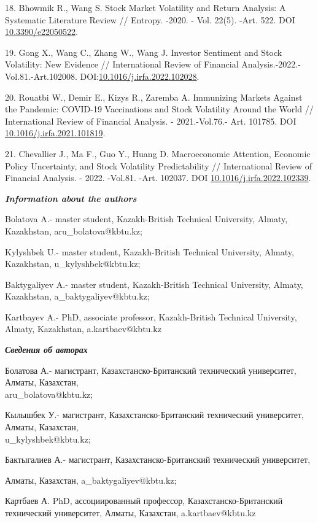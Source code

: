 \begin{references}
18. Bhowmik R., Wang S. Stock Market Volatility and Return Analysis: A
Systematic Literature Review // Entropy. -2020. - Vol. 22(5). -Art. 522.
DOI \href{https://doi.org/10.3390/e22050522}{10.3390/e22050522}.

19. Gong X., Wang C., Zhang W., Wang J. Investor Sentiment and Stock
Volatility: New Evidence // International Review of Financial
Analysis.-2022.-Vol.81.-Art.102008.
DOI:\href{http://dx.doi.org/10.1016/j.irfa.2022.102028}{10.1016/j.irfa.2022.102028}.

20. Rouatbi W., Demir E., Kizys R., Zaremba A. Immunizing Markets Against
the Pandemic: COVID-19 Vaccinations and Stock Volatility Around the
World // International Review of Financial Analysis. - 2021.-Vol.76.-
Art. 101785. DOI \href{https://doi.org/10.1016/j.irfa.2021.101819}{10.1016/j.irfa.2021.101819}.

21. Chevallier J., Ma F., Guo Y., Huang D. Macroeconomic Attention,
Economic Policy Uncertainty, and Stock Volatility Predictability //
International Review of Financial Analysis. - 2022. -Vol.81. -Art.
102037. DOI \href{https://doi.org/10.1016/j.irfa.2022.102339}{10.1016/j.irfa.2022.102339}.
\end{references}

\begin{authorinfo}
\emph{{\bfseries Information about the authors}}

Bolatova A.- master student, Kazakh-British Technical University,
Almaty, Kazakhstan, aru\_bolatova@kbtu.kz;

Kylyshbek U.- master student, Kazakh-British Technical University,
Almaty, Kazakhstan, u\_kylyshbek@kbtu.kz;

Baktygaliyev A.- master student, Kazakh-British Technical University,
Almaty, Kazakhstan, a\_baktygaliyev@kbtu.kz;

Kartbayev A.- PhD, associate professor, Kazakh-British Technical
University, Almaty, Kazakhstan, a.kartbaev@kbtu.kz

\emph{{\bfseries Сведения об авторах}}

Болатова А.- магистрант, Казахстанско-Британский технический
университет, Алматы, Казахстан, \\aru\_bolatova@kbtu.kz;

Кылышбек У.- магистрант, Казахстанско-Британский технический
университет, Алматы, Казахстан, \\u\_kylyshbek@kbtu.kz;

Бактыгалиев А.- магистрант, Казахстанско-Британский технический
университет,

Алматы, Казахстан, a\_baktygaliyev@kbtu.kz;

Картбаев А. PhD, ассоциированный профессор, Казахстанско-Британский
технический университет, Алматы, Казахстан, a.kartbaev@kbtu.kz
\end{authorinfo}
